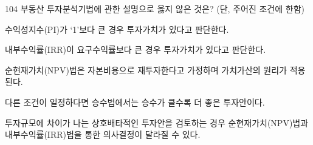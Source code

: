\begin{question}{104}
부동산 투자분석기법에 관한 설명으로 옳지 않은 것은? (단, 주어진 조건에 한함)
\begin{choices}
  \item 수익성지수(PI)가 ‘1’보다 큰 경우 투자가치가 있다고 판단한다.
  \item 내부수익률(IRR)이 요구수익률보다 큰 경우 투자가치가 있다고 판단한다.
  \item 순현재가치(NPV)법은 자본비용으로 재투자한다고 가정하며 가치가산의 원리가 적용된다.
  \item 다른 조건이 일정하다면 승수법에서는 승수가 클수록 더 좋은 투자안이다.
  \item 투자규모에 차이가 나는 상호배타적인 투자안을 검토하는 경우 순현재가치(NPV)법과 내부수익률(IRR)법을 통한 의사결정이 달라질 수 있다.
\end{choices}
\end{question}
